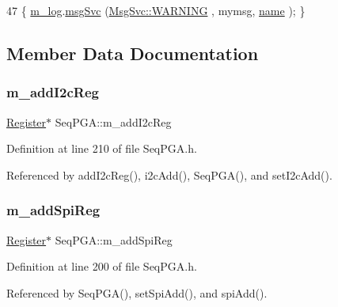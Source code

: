 \begin{DoxyCode}
47 \{ \hyperlink{classObject_a0d269813dd7ac1f24bc143031e2963f2}{m\_log}.\hyperlink{classMsgSvc_ad25f18047920cc59a314e5098259711c}{msgSvc} (\hyperlink{classMsgSvc_ae671eb7301996cd049d2da8a65925926a7cefae88f2ba26b2b05b676a383c834b}{MsgSvc::WARNING} , mymsg, \hyperlink{classObject_a300f4c05dd468c7bb8b3c968868443c1}{name} ); \}
\end{DoxyCode}


\subsection{Member Data Documentation}
\mbox{\label{classSeqPGA_ac3a6aad3fec65ceb78528b6d20deeb3f}} 
\subsubsection{\texorpdfstring{m\+\_\+add\+I2c\+Reg}{m\_addI2cReg}}
{\footnotesize\ttfamily \hyperlink{classRegister}{Register}$\ast$ Seq\+P\+G\+A\+::m\+\_\+add\+I2c\+Reg\hspace{0.3cm}{\ttfamily [private]}}



Definition at line 210 of file Seq\+P\+G\+A.\+h.



Referenced by add\+I2c\+Reg(), i2c\+Add(), Seq\+P\+G\+A(), and set\+I2c\+Add().

\mbox{\label{classSeqPGA_af31d87ad56c501584ccb9c60776a1289}} 
\subsubsection{\texorpdfstring{m\+\_\+add\+Spi\+Reg}{m\_addSpiReg}}
{\footnotesize\ttfamily \hyperlink{classRegister}{Register}$\ast$ Seq\+P\+G\+A\+::m\+\_\+add\+Spi\+Reg\hspace{0.3cm}{\ttfamily [private]}}



Definition at line 200 of file Seq\+P\+G\+A.\+h.



Referenced by Seq\+P\+G\+A(), set\+Spi\+Add(), and spi\+Add().

